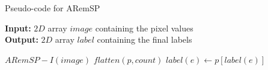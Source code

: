 \begin{algorithm}[H]
\small
{
	\caption{Pseudo-code for ARemSP}
	\label{alg:ARemSP}
	\textbf{Input:} $2D$ array $image$ containing the pixel values \\
	\textbf{Output:} $2D$ array $label$ containing the final labels
	\begin{algorithmic}[1]
		\State $ARemSP-I(image)$ 
		\State $flatten(p,count)$ 
		  
				\State $label(e) \gets p[label(e)]$
			\EndFor
		\EndFor		
	\EndFunction
	\end{algorithmic}	
}
\end{algorithm}

